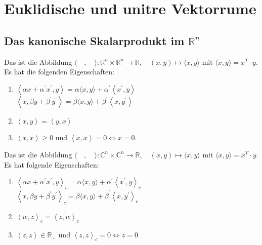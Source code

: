 \documentclass[11pt, a4paper]{article}
\begin{document}
\section{Euklidische und unit\aee re Vektorr\aee ume}

\subsection{Das kanonische Skalarprodukt im $\mathbb{R}^n$}
\begin{definition}
Das  ist die Abbildung $\langle\quad, \quad\rangle: \mathbb{R}^{n} \times \mathbb{R}^{n} \rightarrow \mathbb{R}, \quad(x, y) \mapsto\langle x, y\rangle$ mit $\langle x, y\rangle = x^T \cdot y$.
\\Es hat die folgenden Eigenschaften:
\begin{enumerate}
\item {} $\left\langle \alpha x+ \alpha^{\prime} x^{\prime}, y\right\rangle=\alpha \langle x, y\rangle+ \alpha^{\prime}\left\langle x^{\prime}, y\right\rangle $
\\$\left\langle x, \beta y+ \beta^{\prime} y^{\prime}\right\rangle=\beta \langle x, y\rangle+ \beta^{\prime}\left\langle x, y^{\prime}\right\rangle $
\item {} $\left\langle x, y \right\rangle = \left\langle y, x \right\rangle$
\item {} $\left\langle x, x \right\rangle \geq 0$ und $\left\langle x, x \right\rangle = 0 \Leftrightarrow x = 0$.
\end{enumerate}
\end{definition}

\begin{definition}
Das  ist die Abbildung $\langle\quad, \quad\rangle: \mathbb{C}^{n} \times \mathbb{C}^{n} \rightarrow \mathbb{R}, \quad(x, y) \mapsto\langle x, y\rangle$ mit $\langle x, y\rangle = \overline{x}^T \cdot y$.
\\Es hat folgende Eigenschaften:
\begin{enumerate}
\item {} $\left\langle \alpha x+ \alpha^{\prime} x^{\prime}, y\right\rangle_c=\alpha \langle x, y\rangle+ \alpha^{\prime}\left\langle x^{\prime}, y\right\rangle_c $
\\$\left\langle x, \beta y+ \beta^{\prime} y^{\prime}\right\rangle_c=\overline{\beta} \langle x, y\rangle+ \overline{\beta}^{\prime}\left\langle x, y^{\prime}\right\rangle_c $
\item {} $\left\langle w, z \right\rangle_c = \overline{\left\langle z, w \right\rangle}_c$
\item {} $\left\langle z, z \right\rangle \in \mathbb{R}_+$ und $\left\langle z, z\right\rangle_c = 0 \Leftrightarrow z = 0$
\end{enumerate}
\end{definition}
\end{document}
